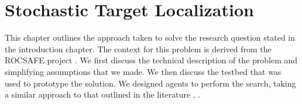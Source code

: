 
\chapter{Stochastic Target Localization}\label{chap:targetLocalisation}
This chapter outlines the approach taken to solve the research question stated in the introduction chapter. The context for this problem is derived from the ROCSAFE project \cite{Bagherzadeh2017ROCSAFE:Incidents}. We first discuss the technical description of the problem and simplifying assumptions that we made. We then discuss the testbed that was used to prototype the solution. We designed agents to perform the search, taking a similar approach to that outlined in the literature \cite{Chung2007ASearch}, \cite{Chung2008Multi-agentFramework}.











\label{sec:SimulationResults}

